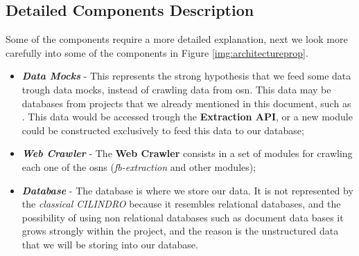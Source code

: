 \subsection{Detailed Components Description}
Some of the components require a more detailed explanation, next we look more carefully into some of the components in Figure \ref{img:architectureprop}.
\begin{itemize}
    \item \textbf{\textit{Data Mocks}} - This represents the strong hypothesis that we feed some data trough data mocks, instead of crawling data from \gls{osn}. This data may be databases from projects that we already mentioned in this document, such as \cite{kunegis2013konect}. This data would be accessed trough the \textbf{Extraction API}, or a new module could be constructed exclusively to feed this data to our database;
    \item \textbf{\textit{Web Crawler}} - The \textbf{Web Crawler} consists in a set of modules for crawling each one of the \glspl{osn} (\textit{fb-extraction} and other modules);
    \item \textbf{\textit{Database}} - The database is where we store our data. It is not represented by the \textit{classical CILINDRO} because it resembles relational databases, and the possibility of using non relational databases such as document data bases it grows strongly within the project, and the reason is the unstructured data that we will be storing into our database.
\end{itemize}

